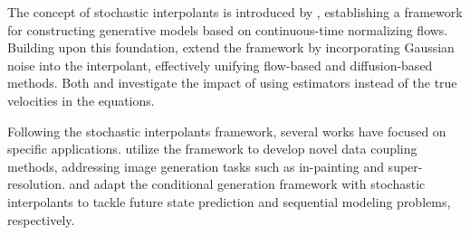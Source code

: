 The concept of stochastic interpolants is introduced by \citet{flows}, establishing a framework for constructing generative models based on continuous-time normalizing flows. %
Building upon this foundation, \citet{interpolation} extend the framework by incorporating Gaussian noise into the interpolant, effectively unifying flow-based and diffusion-based methods. Both \citet{flows} and \citet{interpolation} investigate the impact of using estimators instead of the true velocities in the equations. %

Following the stochastic interpolants framework, several works have focused on specific applications. \citet{albergo2024coupling} utilize the framework to develop novel data coupling methods, addressing image generation tasks such as in-painting and super-resolution.  \citet{chen2024forcasting} and \citet{chen2024recurrent} adapt the conditional generation framework with stochastic interpolants to tackle future state prediction and sequential modeling problems, respectively.

